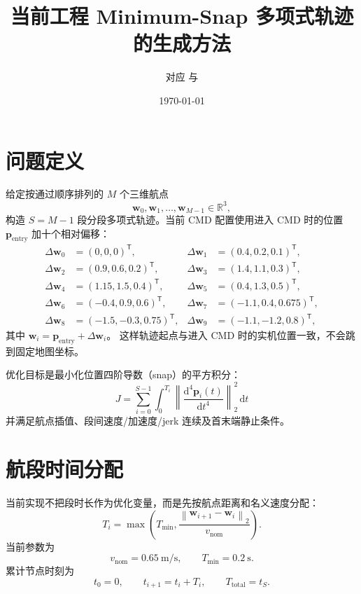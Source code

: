 \documentclass[UTF8,a4paper,11pt]{ctexart}
\title{当前工程 Minimum-Snap 多项式轨迹的生成方法}
\author{对应 \code{minimum_snap_trajectory.h/.cpp} 与 \code{px4ctrlfsm.cpp}}
\date{\today}
\newcommand{\R}{\mathbb{R}}
\newcommand{\trans}{^{\mathsf T}}
\newcommand{\normtwo}[1]{\left\lVert #1\right\rVert_2}
\begin{document}
\maketitle
\tableofcontents

\section{问题定义}

给定按通过顺序排列的 $M$ 个三维航点
\begin{equation}
  \bm w_0,\bm w_1,\ldots,\bm w_{M-1}\in\R^3,
\end{equation}
构造 $S=M-1$ 段分段多项式轨迹。当前 CMD 配置使用进入 CMD 时的位置
$\bm p_{\mathrm{entry}}$ 加十个相对偏移：
\begin{equation}
\begin{aligned}
\Delta\bm w_0&=(0,0,0)\trans,&
\Delta\bm w_1&=(0.4,0.2,0.1)\trans,\\
\Delta\bm w_2&=(0.9,0.6,0.2)\trans,&
\Delta\bm w_3&=(1.4,1.1,0.3)\trans,\\
\Delta\bm w_4&=(1.15,1.5,0.4)\trans,&
\Delta\bm w_5&=(0.4,1.3,0.5)\trans,\\
\Delta\bm w_6&=(-0.4,0.9,0.6)\trans,&
\Delta\bm w_7&=(-1.1,0.4,0.675)\trans,\\
\Delta\bm w_8&=(-1.5,-0.3,0.75)\trans,&
\Delta\bm w_9&=(-1.1,-1.2,0.8)\trans,
\end{aligned}
\end{equation}
其中 $\bm w_i=\bm p_{\mathrm{entry}}+\Delta\bm w_i$。
这样轨迹起点与进入 CMD 时的实机位置一致，不会跳到固定地图坐标。

优化目标是最小化位置四阶导数（snap）的平方积分：
\begin{equation}
  \boxed{
  J=\sum_{i=0}^{S-1}\int_0^{T_i}
  \normtwo{\frac{\mathrm d^4\bm p_i(t)}{\mathrm dt^4}}^2\,\mathrm dt
  }
  \label{eq:snap-objective}
\end{equation}
并满足航点插值、段间速度/加速度/jerk 连续及首末端静止条件。

\section{航段时间分配}

当前实现不把段时长作为优化变量，而是先按航点距离和名义速度分配：
\begin{equation}
  T_i=\max\left(
  T_{\min},
  \frac{\normtwo{\bm w_{i+1}-\bm w_i}}{v_{\mathrm{nom}}}
  \right).
  \label{eq:time-allocation}
\end{equation}
当前参数为
\begin{equation}
  v_{\mathrm{nom}}=0.65\ \mathrm{m/s},\qquad
  T_{\min}=0.2\ \mathrm{s}.
\end{equation}
累计节点时刻为
\begin{equation}
  t_0=0,\qquad t_{i+1}=t_i+T_i,
  \qquad T_{\mathrm{total}}=t_S.
\end{equation}
\end{document}
